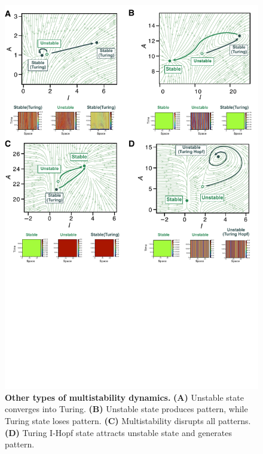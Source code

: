 \begin{figure}[!h]
    \includegraphics[width=1\textwidth]{figures/multistability_leftovers}

    \caption{\textbf{Other types of multistability dynamics.} \textbf{(A)} Unstable state converges into Turing. \textbf{(B)} Unstable state produces pattern, while Turing state loses pattern. \textbf{(C)} Multistability disrupts all patterns. \textbf{(D)} Turing I-Hopf state attracts unstable state and generates pattern.}

    \label{sup_fig4}
\end{figure}




